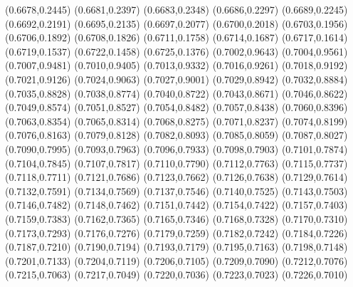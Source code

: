 \PST@Cross(0.6678,0.2445)
\PST@Cross(0.6681,0.2397)
\PST@Cross(0.6683,0.2348)
\PST@Cross(0.6686,0.2297)
\PST@Cross(0.6689,0.2245)
\PST@Cross(0.6692,0.2191)
\PST@Cross(0.6695,0.2135)
\PST@Cross(0.6697,0.2077)
\PST@Cross(0.6700,0.2018)
\PST@Cross(0.6703,0.1956)
\PST@Cross(0.6706,0.1892)
\PST@Cross(0.6708,0.1826)
\PST@Cross(0.6711,0.1758)
\PST@Cross(0.6714,0.1687)
\PST@Cross(0.6717,0.1614)
\PST@Cross(0.6719,0.1537)
\PST@Cross(0.6722,0.1458)
\PST@Cross(0.6725,0.1376)
\PST@Cross(0.7002,0.9643)
\PST@Cross(0.7004,0.9561)
\PST@Cross(0.7007,0.9481)
\PST@Cross(0.7010,0.9405)
\PST@Cross(0.7013,0.9332)
\PST@Cross(0.7016,0.9261)
\PST@Cross(0.7018,0.9192)
\PST@Cross(0.7021,0.9126)
\PST@Cross(0.7024,0.9063)
\PST@Cross(0.7027,0.9001)
\PST@Cross(0.7029,0.8942)
\PST@Cross(0.7032,0.8884)
\PST@Cross(0.7035,0.8828)
\PST@Cross(0.7038,0.8774)
\PST@Cross(0.7040,0.8722)
\PST@Cross(0.7043,0.8671)
\PST@Cross(0.7046,0.8622)
\PST@Cross(0.7049,0.8574)
\PST@Cross(0.7051,0.8527)
\PST@Cross(0.7054,0.8482)
\PST@Cross(0.7057,0.8438)
\PST@Cross(0.7060,0.8396)
\PST@Cross(0.7063,0.8354)
\PST@Cross(0.7065,0.8314)
\PST@Cross(0.7068,0.8275)
\PST@Cross(0.7071,0.8237)
\PST@Cross(0.7074,0.8199)
\PST@Cross(0.7076,0.8163)
\PST@Cross(0.7079,0.8128)
\PST@Cross(0.7082,0.8093)
\PST@Cross(0.7085,0.8059)
\PST@Cross(0.7087,0.8027)
\PST@Cross(0.7090,0.7995)
\PST@Cross(0.7093,0.7963)
\PST@Cross(0.7096,0.7933)
\PST@Cross(0.7098,0.7903)
\PST@Cross(0.7101,0.7874)
\PST@Cross(0.7104,0.7845)
\PST@Cross(0.7107,0.7817)
\PST@Cross(0.7110,0.7790)
\PST@Cross(0.7112,0.7763)
\PST@Cross(0.7115,0.7737)
\PST@Cross(0.7118,0.7711)
\PST@Cross(0.7121,0.7686)
\PST@Cross(0.7123,0.7662)
\PST@Cross(0.7126,0.7638)
\PST@Cross(0.7129,0.7614)
\PST@Cross(0.7132,0.7591)
\PST@Cross(0.7134,0.7569)
\PST@Cross(0.7137,0.7546)
\PST@Cross(0.7140,0.7525)
\PST@Cross(0.7143,0.7503)
\PST@Cross(0.7146,0.7482)
\PST@Cross(0.7148,0.7462)
\PST@Cross(0.7151,0.7442)
\PST@Cross(0.7154,0.7422)
\PST@Cross(0.7157,0.7403)
\PST@Cross(0.7159,0.7383)
\PST@Cross(0.7162,0.7365)
\PST@Cross(0.7165,0.7346)
\PST@Cross(0.7168,0.7328)
\PST@Cross(0.7170,0.7310)
\PST@Cross(0.7173,0.7293)
\PST@Cross(0.7176,0.7276)
\PST@Cross(0.7179,0.7259)
\PST@Cross(0.7182,0.7242)
\PST@Cross(0.7184,0.7226)
\PST@Cross(0.7187,0.7210)
\PST@Cross(0.7190,0.7194)
\PST@Cross(0.7193,0.7179)
\PST@Cross(0.7195,0.7163)
\PST@Cross(0.7198,0.7148)
\PST@Cross(0.7201,0.7133)
\PST@Cross(0.7204,0.7119)
\PST@Cross(0.7206,0.7105)
\PST@Cross(0.7209,0.7090)
\PST@Cross(0.7212,0.7076)
\PST@Cross(0.7215,0.7063)
\PST@Cross(0.7217,0.7049)
\PST@Cross(0.7220,0.7036)
\PST@Cross(0.7223,0.7023)
\PST@Cross(0.7226,0.7010)
